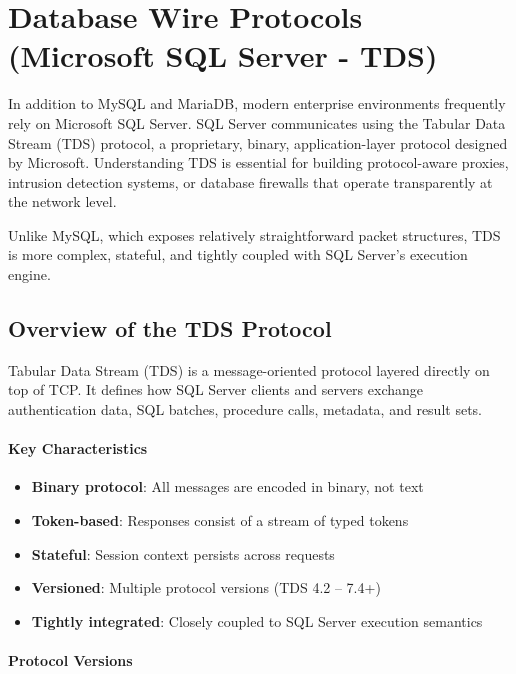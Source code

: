 \section{Database Wire Protocols (Microsoft SQL Server - TDS)}

In addition to MySQL and MariaDB, modern enterprise environments frequently rely on Microsoft SQL Server. SQL Server communicates using the Tabular Data Stream (TDS) protocol, a proprietary, binary, application-layer protocol designed by Microsoft. Understanding TDS is essential for building protocol-aware proxies, intrusion detection systems, or database firewalls that operate transparently at the network level.

Unlike MySQL, which exposes relatively straightforward packet structures, TDS is more complex, stateful, and tightly coupled with SQL Server’s execution engine.

\subsection{Overview of the TDS Protocol}

Tabular Data Stream (TDS) is a message-oriented protocol layered directly on top of TCP. It defines how SQL Server clients and servers exchange authentication data, SQL batches, procedure calls, metadata, and result sets.

\paragraph{Key Characteristics}

\begin{itemize}
    \item \textbf{Binary protocol}: All messages are encoded in binary, not text
    \item \textbf{Token-based}: Responses consist of a stream of typed tokens
    \item \textbf{Stateful}: Session context persists across requests
    \item \textbf{Versioned}: Multiple protocol versions (TDS 4.2 – 7.4+)
    \item \textbf{Tightly integrated}: Closely coupled to SQL Server execution semantics
\end{itemize}

\paragraph{Protocol Versions}

